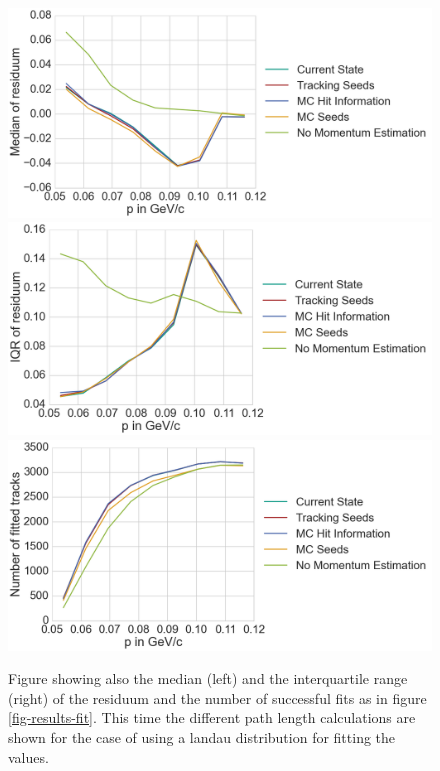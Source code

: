 \begin{figure}
  \centering
  \includegraphics[width=0.48\linewidth]{figures/vxd/landauKalman0_3Median.png}
  \includegraphics[width=0.48\linewidth]{figures/vxd/landauKalman0_3IQR.png}
  \includegraphics[width=0.48\linewidth]{figures/vxd/landauKalman0_3Count.png}
  \caption[Residuum of the momentum estimation for different path length calculations.]{Figure showing also the median (left) and the interquartile range (right) of the residuum and the number of successful fits as in figure \ref{fig-results-fit}. This time the different path length calculations are shown for the case of using a landau distribution for fitting the \dedx values.}
  \label{fig-results-fit2}
\end{figure}

